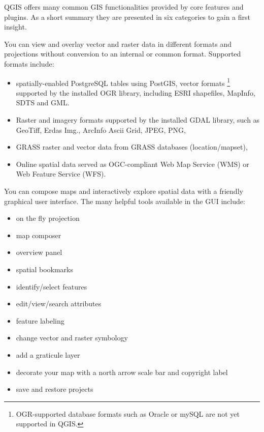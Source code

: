 QGIS offers many common GIS functionalities provided by core features and
plugins. As a short summary they are presented in six categories to gain a
first insight.


You can view and overlay vector and raster data in different formats and
projections without conversion to an internal or common format. Supported
formats include:

\begin{itemize}
\item spatially-enabled PostgreSQL tables using PostGIS, vector formats
\footnote{OGR-supported database formats such as Oracle or mySQL are not yet
supported in QGIS.} supported by the installed OGR library, including ESRI
shapefiles, MapInfo, SDTS and GML.
\item Raster and imagery formats supported by the installed GDAL library, such 
as GeoTiff, Erdas Img., ArcInfo Ascii Grid, JPEG, PNG,
\item GRASS raster and vector data from GRASS databases (location/mapset), 
\item Online spatial data served as OGC-compliant Web Map Service (WMS) or
Web Feature Service (WFS).
\end{itemize}


You can compose maps and interactively explore spatial data with a friendly
graphical user interface. The many helpful tools available in the GUI include:

\begin{itemize}
\item on the fly projection
\item map composer
\item overview panel
\item spatial bookmarks
\item identify/select features
\item edit/view/search attributes
\item feature labeling
\item change vector and raster symbology
\item add a graticule layer
\item decorate your map with a north arrow scale bar and copyright label
\item save and restore projects
\end{itemize}


